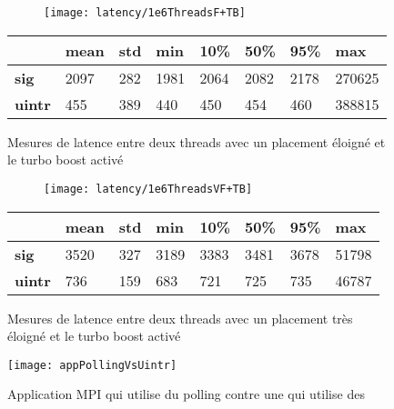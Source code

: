 \begin{figure}[H]
  \begin{subfigure}{\textwidth}
    \texttt{[image: latency/1e6ThreadsF+TB]}
    \caption{}
    \label{subfig:latency1e6ThreadsF-TB}
  \end{subfigure}
  \begin{subtable}{\textwidth}
    \centering
    \begin{tabular}{| l | l | l | l | l | l | l | l |}
      \hline
      &\bf mean &\bf std &\bf min  &\bf 10\% &\bf 50\% &\bf 95\% &\bf max\\
      \hline
      \bf sig   & 2097 & 282 & 1981 & 2064 & 2082 & 2178 & 270625\\
      \hline
      \bf uintr & 455  & 389 & 440  & 450 & 454 & 460 & 388815\\
      \hline
    \end{tabular}
    \caption{}
    \label{tab:latency1e6ThreadsF-TB}
  \end{subtable}
  \caption{Mesures de latence entre deux threads avec un placement éloigné et le turbo boost activé}
  \label{fig:latency1e6ThreadsF-TB}
\end{figure}

\begin{figure}[H]
  \begin{subfigure}{\textwidth}
    \texttt{[image: latency/1e6ThreadsVF+TB]}
    \caption{}
    \label{subfig:latency1e6ThreadsVF-TB}
  \end{subfigure}
  \begin{subtable}{\textwidth}
    \centering
    \begin{tabular}{| l | l | l | l | l | l | l | l |}
      \hline
      &\bf mean &\bf std &\bf min  &\bf 10\% &\bf 50\% &\bf 95\% &\bf max\\
      \hline
      \bf sig   & 3520 & 327 & 3189 & 3383 & 3481 & 3678 & 51798\\
      \hline
      \bf uintr & 736  & 159 & 683 & 721 & 725 & 735 & 46787\\
      \hline
    \end{tabular}
    \caption{}
    \label{tab:latency1e6ThreadsVF-TB}
  \end{subtable}
  \caption{Mesures de latence entre deux threads avec un placement très éloigné et le turbo boost activé}
  \label{fig:latency1e6ThreadsVF-TB}
\end{figure}

\begin{figure}[H]
  \texttt{[image: appPollingVsUintr]}
  \caption{Application MPI qui utilise du polling contre une qui utilise des \uintr{}}
  \label{fig:appPollingVsUintr}
\end{figure}
